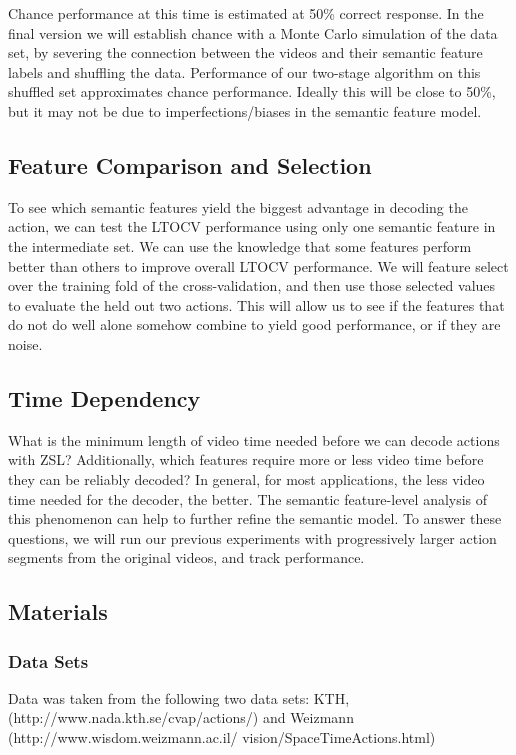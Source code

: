 \documentclass{article}
\begin{document}
Chance performance at this time is estimated at 50\% correct response.  In the final version we will establish chance with a Monte Carlo simulation of the data set, by severing the connection between the videos and their semantic feature labels and shuffling the data. Performance of our two-stage algorithm on this shuffled set approximates chance performance. Ideally this will be close to 50\%, but it may not be due to imperfections/biases in the semantic feature model.
\label{stats}
\subsection{Feature Comparison and Selection}
To see which semantic features yield the biggest advantage in decoding the action, we can test the LTOCV performance using only one semantic feature in the intermediate set. We can use the knowledge that some features perform better than others to improve overall LTOCV performance.  We will feature select over the training fold of the cross-validation, and then use those selected values to evaluate the held out two actions. This will allow us to see if the features that do not do well alone somehow combine to yield good performance, or if they are noise.
\label{fcomp}
\subsection{Time Dependency}
What is the minimum length of video time needed before we can decode actions with ZSL? Additionally, which features require more or less video time before they can be reliably decoded? In general, for most applications, the less video time needed for the decoder, the better.  The semantic feature-level analysis of this phenomenon can help to further refine the semantic model. To answer these questions, we will run our previous experiments with progressively larger action segments from the original videos, and track performance.
\label{time}
\subsection{Materials}
\subsubsection{Data Sets}
Data was taken from the following two data sets: KTH, (http://www.nada.kth.se/cvap/actions/) and Weizmann (http://www.wisdom.weizmann.ac.il/\texttildelow
vision/SpaceTimeActions.html)
\end{document}
